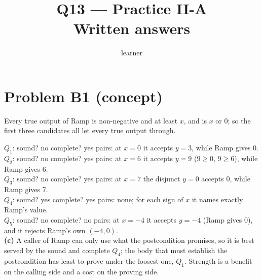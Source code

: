 \documentclass[11pt]{article}
\title{Q13 --- Practice II-A \\ \large Written answers}
\author{learner}
\date{}
\begin{document}
\maketitle
\sloppy

\section*{Problem B1 (concept)}\label{ans:B1}
\begin{answer}
Every true output of Ramp is non-negative and at least $x$, and is $x$ or $0$;
so the first three candidates all let every true output through.

$Q_1$: sound? no \quad complete? yes \quad pairs: at $x = 0$ it accepts
$y = 3$, while Ramp gives $0$. \\
$Q_2$: sound? no \quad complete? yes \quad pairs: at $x = 6$ it accepts
$y = 9$ ($9 \ge 0$, $9 \ge 6$), while Ramp gives $6$. \\
$Q_3$: sound? no \quad complete? yes \quad pairs: at $x = 7$ the disjunct
$y = 0$ accepts $0$, while Ramp gives $7$. \\
$Q_4$: sound? yes \quad complete? yes \quad pairs: none; for each sign of $x$
it names exactly Ramp's value. \\
$Q_5$: sound? no \quad complete? no \quad pairs: at $x = -4$ it accepts
$y = -4$ (Ramp gives $0$), and it rejects Ramp's own $(-4, 0)$. \\
\textbf{(c)} A caller of Ramp can only use what the postcondition promises, so
it is best served by the sound and complete $Q_4$; the body that must
establish the postcondition has least to prove under the loosest one, $Q_1$.
Strength is a benefit on the calling side and a cost on the proving side.
\end{answer}

\end{document}

